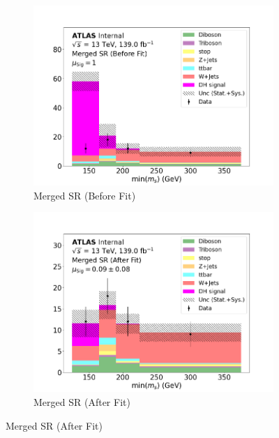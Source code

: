 \begin{figure}[h]
  \centering
  \begin{subfigure}{0.45\textwidth}
    \includegraphics[width=\textwidth]{Figures/8/MonoSlep_monoSWWsemilep_zp1000_dm200_dh160/SR_Merged_before.pdf}
    \caption{Merged SR (Before Fit)}\label{fig:before_SR_merged_MonoSlep_monoSWWsemilep_zp1000_dm200_dh160}
  \end{subfigure} \hspace{1em}
  \begin{subfigure}{0.45\textwidth}
    \includegraphics[width=\textwidth]{Figures/8/MonoSlep_monoSWWsemilep_zp1000_dm200_dh160/SR_Merged_after.pdf}
    \caption{Merged SR (After Fit)}\label{fig:after_SR_resolved_MonoSlep_monoSWWsemilep_zp1000_dm200_dh160}

\end{subfigure}
\end{figure}
